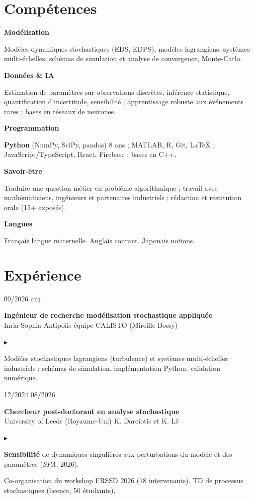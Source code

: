 \documentclass[10pt,a4paper]{article}
\newlength{\datecol}\setlength{\datecol}{0.155\textwidth}
\newlength{\gutter}\setlength{\gutter}{0.85em}
\newlength{\bodycol}
\newcommand{\entry}[3]{%
  \par\vspace{0.55ex}\noindent
  \begin{minipage}[t]{\datecol}
    \vspace{0pt}\raggedright\footnotesize\color{muted}#1
  \end{minipage}%
  \hspace{\gutter}%
  \begin{minipage}[t]{\bodycol}
    \vspace{0pt}\raggedright
    {\headingfont\bfseries\footnotesize #2}\\[0.08ex]
    {\footnotesize\color{accent}#3}
  \end{minipage}%
  \par\vspace{0.12ex}
}
\newenvironment{bullets}
  {\begin{list}{\textcolor{accent}{\scriptsize$\blacktriangleright$}}{%
      \setlength{\leftmargin}{\datecol}
      \addtolength{\leftmargin}{\gutter}
      \addtolength{\leftmargin}{1.15em}
      \setlength{\rightmargin}{0pt}
      \setlength{\labelwidth}{0.85em}
      \setlength{\labelsep}{0.3em}
      \setlength{\itemsep}{0.08ex}
      \setlength{\parsep}{0pt}
      \setlength{\topsep}{0.2ex}
      \setlength{\partopsep}{0pt}
      \footnotesize}}
  {\end{list}}
\newcommand{\skillrow}[2]{%
  \par\noindent
  \begin{minipage}[t]{\datecol}
    \vspace{0pt}\raggedright{\headingfont\bfseries\footnotesize #1}
  \end{minipage}%
  \hspace{\gutter}%
  \begin{minipage}[t]{\bodycol}
    \vspace{0pt}\raggedright\footnotesize #2
  \end{minipage}%
  \par\vspace{0.38ex}
}
\newcommand{\cpp}{\mbox{C++}}
\begin{document}
\section{Compétences}
\skillrow{Modélisation}{Modèles dynamiques stochastiques (EDS, EDPS), modèles lagrangiens, systèmes
multi-échelles, schémas de simulation et analyse de convergence, Monte-Carlo.}
\skillrow{Données \& IA}{Estimation de paramètres sur observations discrètes, inférence statistique,
quantification d'incertitude, sensibilité ; apprentissage robuste aux événements rares ; bases en
réseaux de neurones.}
\skillrow{Programmation}{\textbf{Python} (NumPy, SciPy, pandas) \textemdash{} 8 ans ; MATLAB, R, Git,
\LaTeX{} ; JavaScript/TypeScript, React, Firebase ; bases en \cpp{}.}
\skillrow{Savoir-être}{Traduire une question métier en problème algorithmique ; travail avec
mathématiciens, ingénieurs et partenaires industriels ; rédaction et restitution orale (15+ exposés).}
\skillrow{Langues}{Français \textemdash{} langue maternelle. Anglais \textemdash{} courant. Japonais \textemdash{} notions.}

\section{Expérience}

\entry{09/2026 \textemdash{} auj.}{Ingénieur de recherche \textemdash{} modélisation stochastique appliquée}{Inria Sophia Antipolis \textemdash{} équipe CALISTO (Mireille Bossy)}
\begin{bullets}
  \item Modèles stochastiques lagrangiens (turbulence) et systèmes multi-échelles industriels : schémas de
  simulation, implémentation Python, validation numérique.
\end{bullets}

\entry{12/2024 \textemdash{} 08/2026}{Chercheur post-doctorant en analyse stochastique}{University of Leeds (Royaume-Uni) \textemdash{} K. Dareiotis et K. Lê}
\begin{bullets}
  \item \textbf{Sensibilité} de dynamiques singulières aux perturbations du modèle et des paramètres (\emph{SPA}, 2026).
  \item Co-organisation du workshop FRSSD 2026 (18 intervenants). TD de processus stochastiques (licence, 50 étudiants).
\end{bullets}
\end{document}
